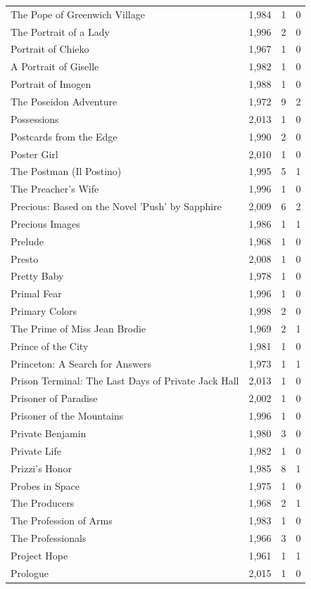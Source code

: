 \begin{tabular}{lrrr}
The Pope of Greenwich Village & 1,984 & 1 & 0 \\
The Portrait of a Lady & 1,996 & 2 & 0 \\
Portrait of Chieko & 1,967 & 1 & 0 \\
A Portrait of Giselle & 1,982 & 1 & 0 \\
Portrait of Imogen & 1,988 & 1 & 0 \\
The Poseidon Adventure & 1,972 & 9 & 2 \\
Possessions & 2,013 & 1 & 0 \\
Postcards from the Edge & 1,990 & 2 & 0 \\
Poster Girl & 2,010 & 1 & 0 \\
The Postman (Il Postino) & 1,995 & 5 & 1 \\
The Preacher's Wife & 1,996 & 1 & 0 \\
Precious: Based on the Novel 'Push' by Sapphire & 2,009 & 6 & 2 \\
Precious Images & 1,986 & 1 & 1 \\
Prelude & 1,968 & 1 & 0 \\
Presto & 2,008 & 1 & 0 \\
Pretty Baby & 1,978 & 1 & 0 \\
Primal Fear & 1,996 & 1 & 0 \\
Primary Colors & 1,998 & 2 & 0 \\
The Prime of Miss Jean Brodie & 1,969 & 2 & 1 \\
Prince of the City & 1,981 & 1 & 0 \\
Princeton: A Search for Answers & 1,973 & 1 & 1 \\
Prison Terminal: The Last Days of Private Jack Hall & 2,013 & 1 & 0 \\
Prisoner of Paradise & 2,002 & 1 & 0 \\
Prisoner of the Mountains & 1,996 & 1 & 0 \\
Private Benjamin & 1,980 & 3 & 0 \\
Private Life & 1,982 & 1 & 0 \\
Prizzi's Honor & 1,985 & 8 & 1 \\
Probes in Space & 1,975 & 1 & 0 \\
The Producers & 1,968 & 2 & 1 \\
The Profession of Arms & 1,983 & 1 & 0 \\
The Professionals & 1,966 & 3 & 0 \\
Project Hope & 1,961 & 1 & 1 \\
Prologue & 2,015 & 1 & 0 \\

\end{tabular}
